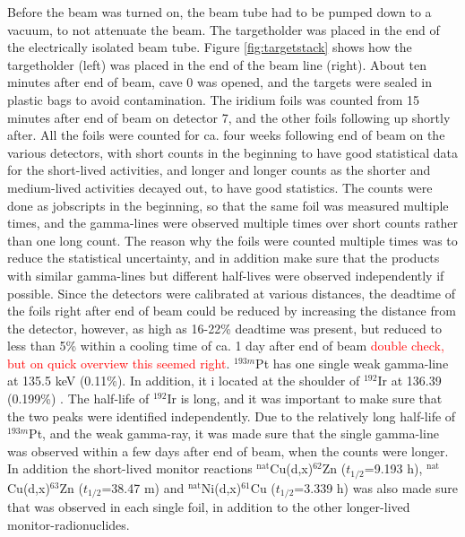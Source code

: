 Before the beam was turned on, the beam tube had to be pumped down to a vacuum, to not attenuate the beam. The targetholder was placed in the end of the electrically isolated beam tube. Figure \ref{fig:targetstack} shows how the targetholder (left) was placed in the end of the beam line (right). About ten minutes after end of beam, cave 0 was opened, and the targets were sealed in plastic bags to avoid contamination. The iridium foils was counted from 15 minutes after end of beam on detector 7, and the other foils following up shortly after. All the foils were counted for ca. four weeks following end of beam on the various detectors, with short counts in the beginning to have good statistical data for the short-lived activities, and longer and longer counts as the shorter and medium-lived activities decayed out, to have good statistics. The counts were done as jobscripts in the beginning, so that the same foil was measured multiple times, and the gamma-lines were observed multiple times over short counts rather than one long count. The reason why the foils were counted multiple times was to reduce the statistical uncertainty, and in addition make sure that the products with similar gamma-lines but different half-lives were observed independently if possible. Since the detectors were calibrated at various distances, the deadtime of the foils right after end of beam could be reduced by increasing the distance from the detector, however, as high as  16-22\% deadtime was present, but reduced to less than 5\% within a cooling time of ca. 1 day after end of beam \textcolor{red}{double check, but on quick overview this seemed right}.
$^{193m}$Pt has one single weak gamma-line at 135.5 keV (0.11\%). In addition, it i located at the shoulder of $^{192}$Ir at 136.39 (0.199\%) \cite{ShamsuzzohaBasunia2017a, Baglin2012}. The half-life of $^{192}$Ir is long, and it was important to make sure that the two peaks were identified independently. 
Due to the relatively long half-life of $^{193m}$Pt, and the weak gamma-ray, it was made sure that the single gamma-line was observed within a few days after end of beam, when the counts were longer. In addition the short-lived monitor reactions $^\text{nat}$Cu(d,x)$^{62}$Zn ($t_{1/2}$=9.193 h), $^\text{nat}$Cu(d,x)$^{63}$Zn ($t_{1/2}$=38.47 m) and $^\text{nat}$Ni(d,x)$^{61}$Cu ($t_{1/2}$=3.339 h)\cite{ERJUN2001, Zuber2015, Nichols2012} was also made sure that was observed in each single foil, in addition to the other longer-lived monitor-radionuclides.  

\noindent 


